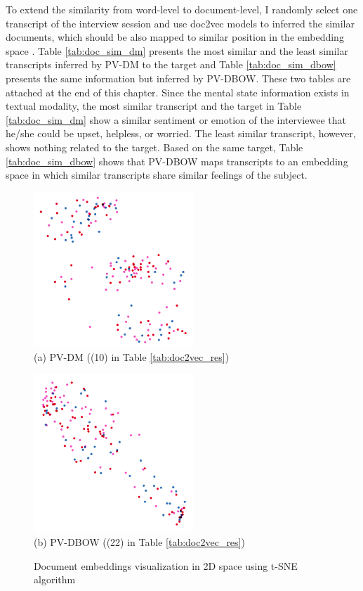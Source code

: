 To extend the similarity from word-level to document-level, I randomly select one transcript of the interview session and use doc2vec models to inferred the similar documents, which should be also mapped to similar position in the embedding space \cite{mikolov2014}. Table \ref{tab:doc_sim_dm} presents the most similar and the least similar transcripts inferred by PV-DM to the target and Table \ref{tab:doc_sim_dbow} presents the same information but inferred by PV-DBOW. These two tables are attached at the end of this chapter. Since the mental state information exists in textual modality, the most similar transcript and the target in Table \ref{tab:doc_sim_dm} show a similar sentiment or emotion of the interviewee that he/she could be upset, helpless, or worried. The least similar transcript, however, shows nothing related to the target. Based on the same target, Table \ref{tab:doc_sim_dbow} shows that PV-DBOW maps transcripts to an embedding space in which similar transcripts share similar feelings of the subject.


\begin{figure}[htb]
    \centering
    \small
    \begin{minipage}{0.42\linewidth}
    \centering
    \includegraphics[width=6cm]{images/results/dm_tsne_2d.png} \\
    (a) PV-DM ((10) in Table \ref{tab:doc2vec_res})
    \end{minipage}
    \hfill
    \begin{minipage}{0.42\linewidth}
    \centering
    \includegraphics[width=6cm]{images/results/dbow_tsne_2d.png} \\
    (b) PV-DBOW ((22) in Table \ref{tab:doc2vec_res})
    \end{minipage}
    \caption{Document embeddings visualization in 2D space using t-SNE algorithm}
    \label{fig:doc2vec_vis_tsne}
\end{figure}


